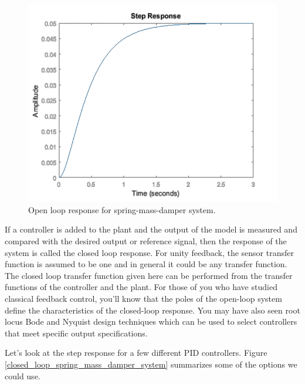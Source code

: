 \begin{figure}[!htb]
\begin{center}
\includegraphics[scale=0.380]{img/longitudinal_control/open_loop_response_spring_mass_damper.jpeg}
\end{center}
\caption{Open loop response for spring-mass-damper system.}
\label{open_loop_response_spring_mass_damper}
\end{figure}

If a controller is added to the plant and the output of the model is measured and compared with the desired output or reference signal, then the response of the system is called the closed loop response. For unity feedback, the sensor transfer function is assumed to be one and in general it could be any transfer function. The closed loop transfer function given here can be performed from the transfer functions of the controller and the plant. For those of you who have studied classical feedback control, you'll know that the poles of the open-loop system define the characteristics of the closed-loop response. You may have also seen root locus Bode and Nyquist design techniques which can be used to select controllers that meet specific output specifications. 

Let's look at the step response for a few different PID controllers. Figure \ref{closed_loop_spring_mass_damper_system}
summarizes some of the options we could use. 

